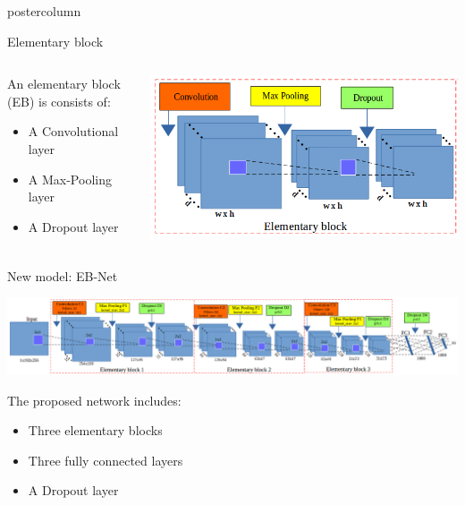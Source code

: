 \begin{frame}
\begin{columns}
\begin{column}{.49\textwidth}
\begin{beamercolorbox}[center,wd=\textwidth]{postercolumn}
\begin{minipage}[T]{.95\textwidth}
{            \begin{block}{Elementary block}
            	\begin{columns}
            		\begin{column}{.45\textwidth}
            			An elementary block (EB) is consists of:
            			\begin{itemize}
            				\item A Convolutional layer
            				\item A Max-Pooling layer
            				\item A Dropout layer
            			\end{itemize}
            		\end{column}
            		\begin{column}{.54\textwidth}
            			\centering
            			\includegraphics[width=.85\textwidth]{images/elementary_block.png}
            		\end{column}
            	\end{columns}
            \end{block}
            
            \vfill
            
            \begin{block}{New model: EB-Net}
            	\begin{center}
            		\includegraphics[width=.96\textwidth]{images/net3.png}\\
            	\end{center}
            The proposed network includes:
            \begin{itemize}
            	\item Three elementary blocks
            	\item Three fully connected layers
            	\item A Dropout layer
            \end{itemize}
            \end{block}
  
}
\end{minipage}
\end{beamercolorbox}
\end{column}
\end{columns}
\end{frame}
